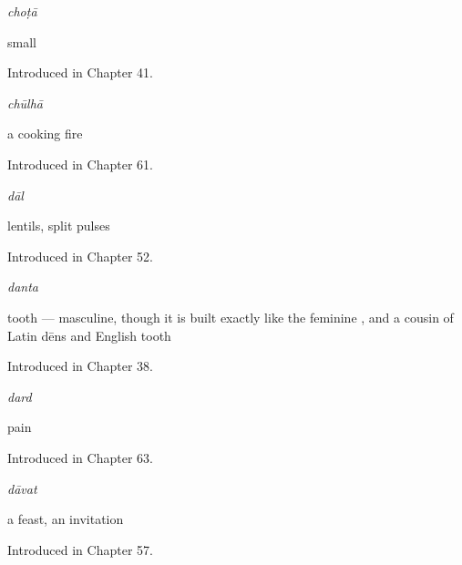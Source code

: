 \noindent\begin{minipage}[t]{\linewidth}
\raggedright
\textbf{}\enspace\emph{choṭā}\par
\small small\par
\footnotesize Introduced in Chapter 41.
\end{minipage}\par\medskip

\noindent\begin{minipage}[t]{\linewidth}
\raggedright
\textbf{}\enspace\emph{chūlhā}\par
\small a cooking fire\par
\footnotesize Introduced in Chapter 61.
\end{minipage}\par\medskip

\noindent\begin{minipage}[t]{\linewidth}
\raggedright
\textbf{}\enspace\emph{dāl}\par
\small lentils, split pulses\par
\footnotesize Introduced in Chapter 52.
\end{minipage}\par\medskip

\noindent\begin{minipage}[t]{\linewidth}
\raggedright
\textbf{}\enspace\emph{danta}\par
\small tooth — masculine, though it is built exactly like the feminine , and a cousin of Latin dēns and English tooth\par
\footnotesize Introduced in Chapter 38.
\end{minipage}\par\medskip

\noindent\begin{minipage}[t]{\linewidth}
\raggedright
\textbf{}\enspace\emph{dard}\par
\small pain\par
\footnotesize Introduced in Chapter 63.
\end{minipage}\par\medskip

\noindent\begin{minipage}[t]{\linewidth}
\raggedright
\textbf{}\enspace\emph{dāvat}\par
\small a feast, an invitation\par
\footnotesize Introduced in Chapter 57.
\end{minipage}\par\medskip

